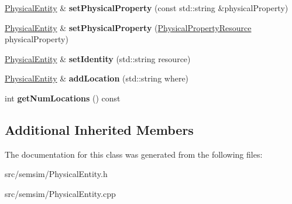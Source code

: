 \begin{DoxyCompactItemize}
\hyperlink{classsemsim_1_1PhysicalEntity}{Physical\+Entity} \& {\bfseries set\+Physical\+Property} (const std\+::string \&physical\+Property)
\item 
\mbox{\label{classsemsim_1_1PhysicalEntity_a4aa4c32d99568eb43ec97d8371ded354}} 
\hyperlink{classsemsim_1_1PhysicalEntity}{Physical\+Entity} \& {\bfseries set\+Physical\+Property} (\hyperlink{classsemsim_1_1PhysicalPropertyResource}{Physical\+Property\+Resource} physical\+Property)
\item 
\mbox{\label{classsemsim_1_1PhysicalEntity_ab3e7a2142a90e18150323268acc92217}} 
\hyperlink{classsemsim_1_1PhysicalEntity}{Physical\+Entity} \& {\bfseries set\+Identity} (std\+::string resource)
\item 
\mbox{\label{classsemsim_1_1PhysicalEntity_a1b35c526b4265b920d9d483842e0150d}} 
\hyperlink{classsemsim_1_1PhysicalEntity}{Physical\+Entity} \& {\bfseries add\+Location} (std\+::string where)
\item 
\mbox{\label{classsemsim_1_1PhysicalEntity_a8db27f0206e3d827f5b8866459a771aa}} 
int {\bfseries get\+Num\+Locations} () const
\end{DoxyCompactItemize}
\subsection*{Additional Inherited Members}


The documentation for this class was generated from the following files\+:\begin{DoxyCompactItemize}
\item 
src/semsim/Physical\+Entity.\+h\item 
src/semsim/Physical\+Entity.\+cpp\end{DoxyCompactItemize}
